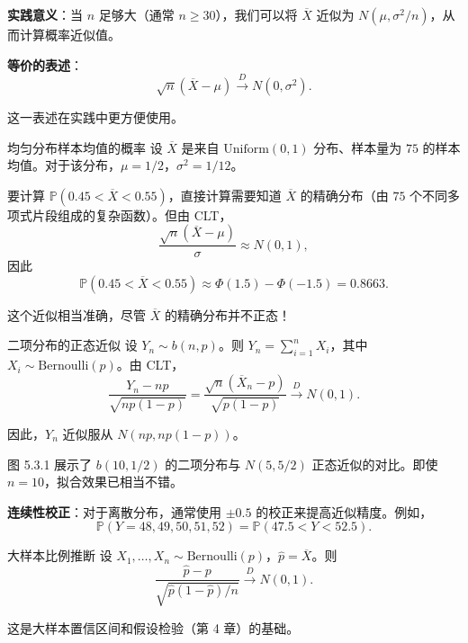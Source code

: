 \textbf{实践意义}：当 $n$ 足够大（通常 $n \geq 30$），我们可以将 $\overline{X}$ 近似为 $N(\mu, \sigma^2/n)$，从而计算概率近似值。%

\textbf{等价的表述}：
\[
\sqrt{n}(\overline{X} - \mu) \xrightarrow{D} N(0, \sigma^2).
\label{eq:clt-alternative}
\]

这一表述在实践中更方便使用。

\begin{example}{均匀分布样本均值的概率}\label{ex:uniform-sample-mean}
设 $\overline{X}$ 是来自 $\mathrm{Uniform}(0,1)$ 分布、样本量为 $75$ 的样本均值。对于该分布，$\mu = 1/2$，$\sigma^2 = 1/12$。

要计算 $\mathbb{P}(0.45 < \overline{X} < 0.55)$，直接计算需要知道 $\overline{X}$ 的精确分布（由 $75$ 个不同多项式片段组成的复杂函数）。但由 CLT，
\[
\frac{\sqrt{n}(\overline{X} - \mu)}{\sigma} \approx N(0,1),
\]
因此
\[
\mathbb{P}(0.45 < \overline{X} < 0.55) \approx \Phi(1.5) - \Phi(-1.5) = 0.8663.
\label{eq:uniform-clt-approx}
\]

这个近似相当准确，尽管 $\overline{X}$ 的精确分布并不正态！%
\end{example}

\begin{example}{二项分布的正态近似}\label{ex:binomial-normal-approx}
设 $Y_n \sim b(n,p)$。则 $Y_n = \sum_{i=1}^n X_i$，其中 $X_i \sim \mathrm{Bernoulli}(p)$。由 CLT，
\[
\frac{Y_n - np}{\sqrt{np(1-p)}} = \frac{\sqrt{n}(\overline{X}_n - p)}{\sqrt{p(1-p)}} \xrightarrow{D} N(0,1).
\label{eq:binomial-clt}
\]

因此，$Y_n$ 近似服从 $N(np, np(1-p))$。

图 5.3.1 展示了 $b(10, 1/2)$ 的二项分布与 $N(5, 5/2)$ 正态近似的对比。即使 $n=10$，拟合效果已相当不错。

\textbf{连续性校正}：对于离散分布，通常使用 $\pm 0.5$ 的校正来提高近似精度。例如，
\[
\mathbb{P}(Y = 48, 49, 50, 51, 52) = \mathbb{P}(47.5 < Y < 52.5).
\label{eq:continuity-correction}
\]
\end{example}

\begin{example}{大样本比例推断}\label{ex:proportion-inference}
设 $X_1, \ldots, X_n \sim \mathrm{Bernoulli}(p)$，$\widehat{p} = \overline{X}$。则
\[
\frac{\widehat{p} - p}{\sqrt{\widehat{p}(1-\widehat{p})/n}} \xrightarrow{D} N(0,1).
\label{eq:proportion-clt}
\]

这是大样本置信区间和假设检验（第 4 章）的基础。%
\end{example}


